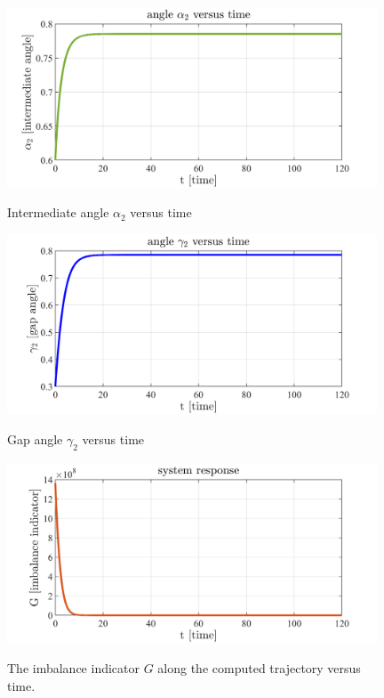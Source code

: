 \documentclass{aims}
\theoremstyle{definition}
\begin{document}
	\begin{figure}[htp]
		\begin{center}
			\includegraphics[width=11cm]{optstabilalpha2.png}\\
			\caption{Intermediate angle $\alpha_2$ versus time}
			\label{optcontrollab3}
		\end{center}
	\end{figure}
	
	\begin{figure}[htp]
		\begin{center}
			\includegraphics[width=11cm]{optstabilgamma2.png}\\
			\caption{Gap angle $\gamma_2$ versus time}
			\label{optcontrollab4}
		\end{center}
	\end{figure}
	
	\begin{figure}[htp]
		\begin{center}
			\includegraphics[width=11cm]{systemresponse.png}\\
			\caption{The imbalance indicator $G$ along the computed trajectory versus time.}
			\label{systemresponse}
		\end{center}
	\end{figure}
\end{document}
